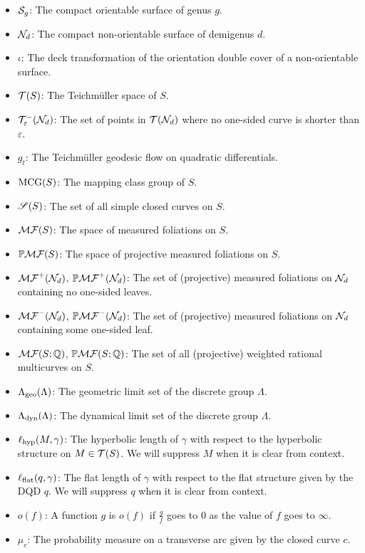 \documentclass[12pt, reqno]{amsart}
\begin{document}
\begin{itemize}
\item[] $\mathcal{S}_g$: The compact orientable surface of genus $g$.
\item[] $\mathcal{N}_{d}$: The compact non-orientable surface of demigenus $d$.
\item[] $\iota$: The deck transformation of the orientation double cover of a non-orientable surface.
\item[] $\mathcal{T}(S)$: The Teichm\"uller space of $S$.
\item[] $\mathcal{T}_{\varepsilon}^{-}(\mathcal{N}_d)$: The set of points in $\mathcal{T}(\mathcal{N}_d)$ where no one-sided curve is shorter than
  $\varepsilon$.
\item[] $g_t$: The Teichm\"uller geodesic flow on quadratic differentials.
\item[] $\mathrm{MCG}(S)$: The mapping class group of $S$.
\item[] $\mathscr{S}(S)$: The set of all simple closed curves on $S$.
\item[] $\mathcal{MF}(S)$: The space of measured foliations on $S$.
\item[] $\mathbb{P}\mathcal{MF}(S)$: The space of projective measured foliations on $S$.
\item[] $\mathcal{MF}^+(\mathcal{N}_d)$, $\mathbb{P}\mathcal{MF}^+(\mathcal{N}_d)$: The set of (projective) measured foliations on $\mathcal{N}_d$ containing
  no one-sided leaves.
\item[] $\mathcal{MF}^-(\mathcal{N}_d)$, $\mathbb{P}\mathcal{MF}^-(\mathcal{N}_d)$: The set of (projective) measured foliations on $\mathcal{N}_d$ containing
  some one-sided leaf.
\item[] $\mathcal{MF}(S; \mathbb{Q})$, $\mathbb{P}\mathcal{MF}(S; \mathbb{Q})$: The set of all (projective) weighted rational multicurves on $S$.
\item[] $\Lambda_{\mathrm{geo}}(\Lambda)$: The geometric limit set of the discrete group $\Lambda$.
\item[] $\Lambda_{\mathrm{dyn}}(\Lambda)$: The dynamical limit set of the discrete group $\Lambda$.
\item[] $\ell_{\mathrm{hyp}}(M, \gamma)$: The hyperbolic length of $\gamma$ with respect to the hyperbolic structure on $M \in \mathcal{T}(S)$. We will suppress $M$ when it is clear from context.
\item[] $\ell_{\mathrm{flat}}(q, \gamma)$: The flat length of $\gamma$ with respect to the flat structure given by the DQD $q$. We will suppress $q$ when it is clear from context.
\item[] $o(f)$: A function $g$ is $o(f)$ if $\frac{g}{f}$ goes to $0$ as the value of $f$ goes to $\infty$.
\item[] $\mu_{c}$: The probability measure on a transverse arc given by the closed curve $c$.
\end{itemize}
\end{document}
